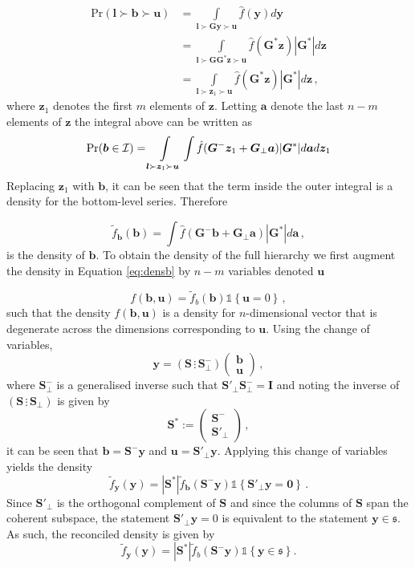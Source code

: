 \documentclass[12pt]{article}
\theoremstyle{definition}
\begin{document}
\begin{align}
\mbox{Pr}(\bm{l}\succ\bm{b}\succ\bm{u})&=\int\limits_{\bm{l}\succ\bm{G}\bm{y}\succ\bm{u}}\hat{f}(\bm{y})d{\bm y}\nonumber\\
&=\int\limits_{\bm{l}\succ\bm{G}\bm{G}^*\bm{z}\succ\bm{u}}\hat{f}(\bm{G}^*\bm{z})|\bm{G}^*|d{\bm z}\nonumber\\
&=\int\limits_{\bm{l}\succ\bm{z}_1\succ\bm{u}}\hat{f}(\bm{G}^*\bm{z})|\bm{G}^*|d{\bm z}\nonumber\,,
\end{align}
where $\bm{z}_1$ denotes the first $m$ elements of $\bm z$.  Letting $\bm{a}$ denote the last $n-m$ elements of $\bm{z}$ the integral above can be written as
\[
\mbox{Pr}({\bm b}\in \mathcal{I})=\int\limits_{\bm{l}\succ\bm{z}_1\succ\bm{u}}\int\hat{f}(\bm{G}^{-}\bm{z}_1+\bm{G}_{\perp}\bm{a})|\bm{G}^*|d{\bm a}d{\bm z}_1\nonumber\\
\]
Replacing ${\bm z}_1$ with ${\bm b}$, it can be seen that the term inside the outer integral is a density for the bottom-level series. Therefore

\begin{equation}
\tilde{f}_{\bm{b}}(\bm{b})=\int\hat{f}(\bm{G}^{-}\bm{b}+\bm{G}_{\perp}\bm{a})|\bm{G}^*|d{\bm a}\,,
\label{eq:densb}
\end{equation}
is the density of ${\bm b}$. To obtain the density of the full hierarchy we first augment the density in Equation \eqref{eq:densb} by $n-m$ variables denoted $\bm{u}$

\begin{equation}
f(\bm{b},\bm{u})=\tilde{f}_b(\bm{b})\mathbb{1}\left\{\bm{u}=0\right\}\,,
\end{equation}
such that the density $f(\bm{b},\bm{u})$ is a density for $n$-dimensional vector that is degenerate across the dimensions corresponding to $\bm{u}$.  Using the change of variables,
\[
\bm{y}=\left(\bm{S}\,\vdots\,\bm{S}^-_{\perp}\right)\begin{pmatrix}\bm{b}\\\bm{u}
\end{pmatrix}\,,
\]
where $\bm{S}^-_{\perp}$ is a generalised inverse such that $\bm{S}'_{\perp}\bm{S}^-_{\perp}=\bm{I}$ and noting the inverse of $\left(\bm{S}\,\vdots\,\bm{S}_{\perp}\right)$ is given by
\[
\bm{S}^*:=\begin{pmatrix}\bm{S}^{-}\\\bm{S}'_{\perp}\end{pmatrix}\,,
\]
it can be seen that $\bm{b}=\bm{S}^-\bm{y}$ and $\bm{u}=\bm{S}'_\perp\bm{y}$.  Applying this change of variables yields the density
\[
\tilde{f}_{\bm{y}}(\bm{y})=|\bm{S}^*|\tilde{f}_{\bm b}(\bm{S}^-\bm{y})\mathbb{1}\left\{\bm{S}'_\perp\bm{y}=\bm{0}\right\}\,.
\]
Since $\bm{S}'_\perp$ is the orthogonal complement of $\bm{S}$ and since the columns of $\bm{S}$ span the coherent subspace, the statement $\bm{S}'_\perp\bm{y}=0$ is equivalent to the statement $\bm{y}\in\mathfrak{s}$.  As such, the reconciled density is given by
\[
\tilde{f}_{\bm{y}}(\bm{y})=|\bm{S}^*|\tilde{f}_b(\bm{S}^-\bm{y})\mathbb{1}\left\{\bm{y}\in\mathfrak{s}\right\}.
\]
\clearpage
\end{document}
